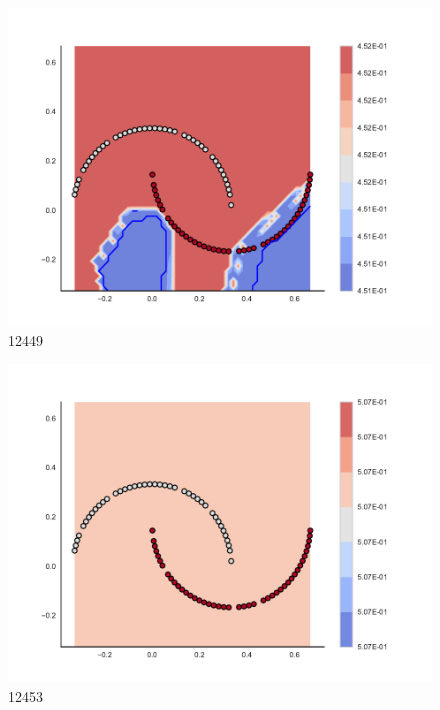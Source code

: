 \begin{subfigure}[b]{0.09\textwidth}
    \includegraphics[clip, trim=2.35cm 1.75cm 4.5cm 0cm,width=\textwidth]{img/convergence/12449.pdf}
    \caption{12449}
    \label{fig:convergence_12449}
\end{subfigure}
%
\begin{subfigure}[b]{0.09\textwidth}
    \includegraphics[clip, trim=2.35cm 1.75cm 4.5cm 0cm,width=\textwidth]{img/convergence/12453.pdf}
    \caption{12453}
    \label{fig:convergence_12453}
\end{subfigure}
%
